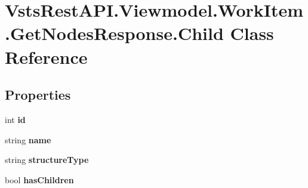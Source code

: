 \hypertarget{class_vsts_rest_a_p_i_1_1_viewmodel_1_1_work_item_1_1_get_nodes_response_1_1_child}{}\section{Vsts\+Rest\+A\+P\+I.\+Viewmodel.\+Work\+Item.\+Get\+Nodes\+Response.\+Child Class Reference}
\label{class_vsts_rest_a_p_i_1_1_viewmodel_1_1_work_item_1_1_get_nodes_response_1_1_child}
\subsection*{Properties}
\begin{DoxyCompactItemize}
\item 
\mbox{\label{class_vsts_rest_a_p_i_1_1_viewmodel_1_1_work_item_1_1_get_nodes_response_1_1_child_a496751316cbcd5754f4fa0b4bad5d27b}} 
int {\bfseries id}
\item 
\mbox{\label{class_vsts_rest_a_p_i_1_1_viewmodel_1_1_work_item_1_1_get_nodes_response_1_1_child_aecf82d9cece71f663998d983b51fd3b2}} 
string {\bfseries name}
\item 
\mbox{\label{class_vsts_rest_a_p_i_1_1_viewmodel_1_1_work_item_1_1_get_nodes_response_1_1_child_af38ec0c4fefff7796c4d6b9bef5138cd}} 
string {\bfseries structure\+Type}
\item 
\mbox{\label{class_vsts_rest_a_p_i_1_1_viewmodel_1_1_work_item_1_1_get_nodes_response_1_1_child_ad30387cc0fe1d16e4bebf951872481cf}} 
bool {\bfseries has\+Children}
\item 

\end{DoxyCompactItemize}

